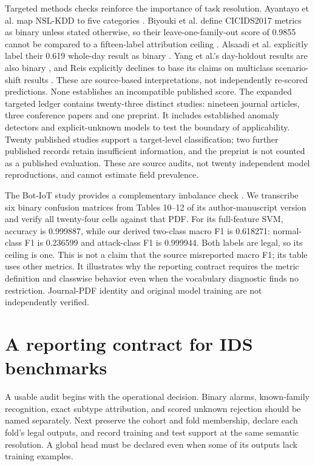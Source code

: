 \documentclass[twocolumn]{svjour3}
\begin{document}
Targeted methods checks reinforce the importance of task resolution. Ayantayo et al. map NSL-KDD to five categories \cite{ayantayo2023}. Biyouki et al. define CICIDS2017 metrics as binary unless stated otherwise, so their leave-one-family-out score of 0.9855 cannot be compared to a fifteen-label attribution ceiling \cite{biyouki2026}. Alsaadi et al. explicitly label their 0.619 whole-day result as binary \cite{alsaadi2026}. Yang et al.'s day-holdout results are also binary \cite{yang2026}, and Reis explicitly declines to base its claims on multiclass scenario-shift results \cite{reis2026}. These are source-based interpretations, not independently re-scored predictions. None establishes an incompatible published score. The expanded targeted ledger contains twenty-three distinct studies: nineteen journal articles, three conference papers and one preprint. It includes established anomaly detectors and explicit-unknown models to test the boundary of applicability. Twenty published studies support a target-level classification; two further published records retain insufficient information, and the preprint is not counted as a published evaluation. These are source audits, not twenty independent model reproductions, and cannot estimate field prevalence.

The Bot-IoT study provides a complementary imbalance check \cite{koroniotis2019}. We transcribe six binary confusion matrices from Tables 10--12 of its author-manuscript version and verify all twenty-four cells against that PDF. For its full-feature SVM, accuracy is 0.999887, while our derived two-class macro F1 is 0.618271: normal-class F1 is 0.236599 and attack-class F1 is 0.999944. Both labels are legal, so its ceiling is one. This is not a claim that the source misreported macro F1; its table uses other metrics. It illustrates why the reporting contract requires the metric definition and classwise behavior even when the vocabulary diagnostic finds no restriction. Journal-PDF identity and original model training are not independently verified.

\section{A reporting contract for IDS benchmarks}
A usable audit begins with the operational decision. Binary alarms, known-family recognition, exact subtype attribution, and scored unknown rejection should be named separately. Next preserve the cohort and fold membership, declare each fold's legal outputs, and record training and test support at the same semantic resolution. A global head must be declared even when some of its outputs lack training examples.
\end{document}
